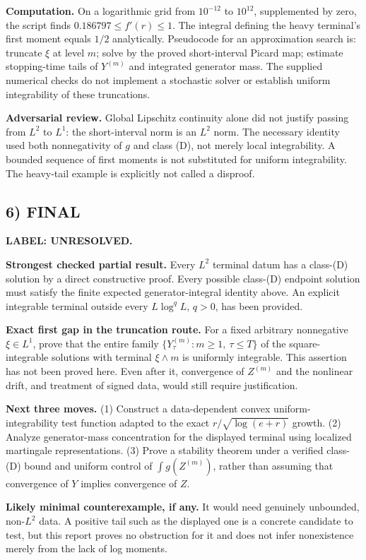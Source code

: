 \documentclass[11pt,a4paper]{article}
\theoremstyle{definition}
\newcommand{\unresolved}{\textbf{LABEL: UNRESOLVED.}}
\begin{document}
\textbf{Computation.} On a logarithmic grid from $10^{-12}$ to $10^{12}$, supplemented by zero, the script finds $0.186797\le f'(r)\le1$. The integral defining the heavy terminal's first moment equals $1/2$ analytically. Pseudocode for an approximation search is: truncate $\xi$ at level $m$; solve by the proved short-interval Picard map; estimate stopping-time tails of $Y^{(m)}$ and integrated generator mass. The supplied numerical checks do not implement a stochastic solver or establish uniform integrability of these truncations.

\textbf{Adversarial review.} Global Lipschitz continuity alone did not justify passing from $L^2$ to $L^1$: the short-interval norm is an $L^2$ norm. The necessary identity used both nonnegativity of $g$ and class (D), not merely local integrability. A bounded sequence of first moments is not substituted for uniform integrability. The heavy-tail example is explicitly not called a disproof.

\subsection*{6) FINAL}
\unresolved

\textbf{Strongest checked partial result.} Every $L^2$ terminal datum has a class-(D) solution by a direct constructive proof. Every possible class-(D) endpoint solution must satisfy the finite expected generator-integral identity above. An explicit integrable terminal outside every $L\log^q L$, $q>0$, has been provided.

\textbf{Exact first gap in the truncation route.} For a fixed arbitrary nonnegative $\xi\in L^1$, prove that the entire family
$\{Y^{(m)}_\tau:m\ge1,\ \tau\le T\}$ of the square-integrable solutions with terminal $\xi\wedge m$ is uniformly integrable. This assertion has not been proved here. Even after it, convergence of $Z^{(m)}$ and the nonlinear drift, and treatment of signed data, would still require justification.

\textbf{Next three moves.} (1) Construct a data-dependent convex uniform-integrability test function adapted to the exact $r/\sqrt{\log(e+r)}$ growth. (2) Analyze generator-mass concentration for the displayed terminal using localized martingale representations. (3) Prove a stability theorem under a verified class-(D) bound and uniform control of $\int g(Z^{(m)})$, rather than assuming that convergence of $Y$ implies convergence of $Z$.

\textbf{Likely minimal counterexample, if any.} It would need genuinely unbounded, non-$L^2$ data. A positive tail such as the displayed one is a concrete candidate to test, but this report proves no obstruction for it and does not infer nonexistence merely from the lack of log moments.
\end{document}
